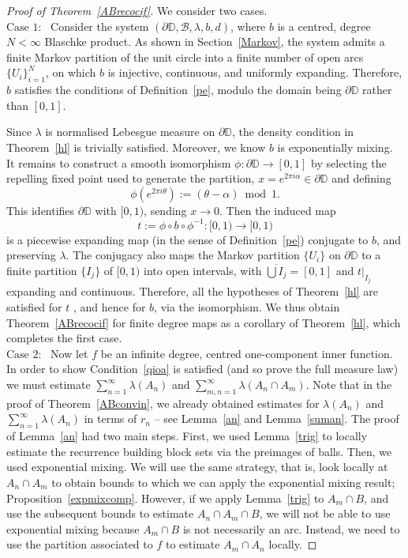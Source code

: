 \documentclass[11pt,reqno]{amsart}
\newcommand{\0}{\mathbf{0}}
\theoremstyle{remark}
\numberwithin{equation}{section}
\theoremstyle{remark}
\numberwithin{equation}{section}
\begin{document}
\begin{proof}[Proof of Theorem~\ref{ABrecocif}]
We consider two cases.\\[0.3em]
\textbf{$\text{Case 1:}$} $\,$ Consider the system $(\partial \mathbb{D}, \mathcal{B}, \lambda, b,d) $, where $b$ is a centred, degree $N < \infty$ Blaschke product. As shown in Section~\ref{Markov}, the system admits a finite Markov partition of the unit circle into a finite number of open arcs $\{U_i\}_{i=1}^N$, on which $b$ is injective, continuous, and uniformly expanding. Therefore, $b$ satisfies the conditions of Definition~\ref{pe}, modulo the domain being $\partial \mathbb{D}$ rather than $ [0,1]$.

Since $\lambda$ is normalised Lebesgue measure on $\partial \mathbb{D}$, the density condition in Theorem~\ref{hl} is trivially satisfied. Moreover, we know $b$ is exponentially mixing.
It remains to construct a smooth isomorphism  $\phi: \partial \mathbb{D} \to [0,1]$ by selecting the repelling fixed point used to generate the partition,  $x = e^{2\pi i \alpha} \in \partial \mathbb{D}$ and defining
$$
\phi(e^{2\pi i \theta}) := (\theta - \alpha) \bmod 1.
$$
This identifies $ \partial \mathbb{D}$ with $[0,1)$, sending $x \to 0$. Then the induced map $$t := \phi \circ b \circ \phi^{-1} : [0,1) \to [0,1)$$ is a piecewise expanding map (in the sense of Definition~\ref{pe}) conjugate to $b$, and preserving $\lambda$. The conjugacy also maps the Markov partition $\{U_i\}$ on $\partial \mathbb{D}$ to a finite partition $\{I_j\}$ of $[0,1)$ into open intervals, with $\overline{\bigcup I_j} = [0,1]$ and $ t|_{I_j}$ expanding and continuous. Therefore, all the hypotheses of Theorem~\ref{hl} are satisfied for $t$ , and hence for $b$, via the isomorphism. We thus obtain Theorem~\ref{ABrecocif} for finite degree maps as a corollary of Theorem~\ref{hl},
which completes the first case.\\[0.5em]
\textbf{$\text{Case 2:}$} $\,$
Now let $f$ be an infinite degree, centred one-component inner function. In order to show Condition~\eqref{qioa} is satisfied (and so prove the full measure law) we must estimate $\sum_{n=1}^\infty \lambda(A_n)$ and $\sum_{m,n=1}^\infty \lambda(A_n \cap A_m)$.
Note that in the proof of Theorem~\ref{ABconvin}, we already obtained estimates for $\lambda(A_n)$ and $\sum_{n=1}^\infty \lambda(A_n)$ in terms of $r_n$ -- see Lemma~\ref{an} and Lemma~\ref{suman}. The proof of Lemma~\ref{an} had two main steps. First, we used Lemma~\ref{trig} to locally estimate the recurrence building block sets via the preimages of balls. Then, we used exponential mixing.
 We will use the same strategy, that is, look locally at $A_n \cap A_m$ to obtain bounds to which we can apply the exponential mixing result; Proposition~\ref{expmixcomp}. 
However, if we apply Lemma~\ref{trig} to $A_m \cap B$, and use the subsequent bounds to estimate $A_n \cap A_m \cap B$, we will not be able to use exponential mixing because $ A_m \cap B$ is not necessarily an arc.
 Instead, we need to use the partition associated to $f$ to estimate $A_m \cap A_n$ locally. 
 

\end{proof}
\end{document}

